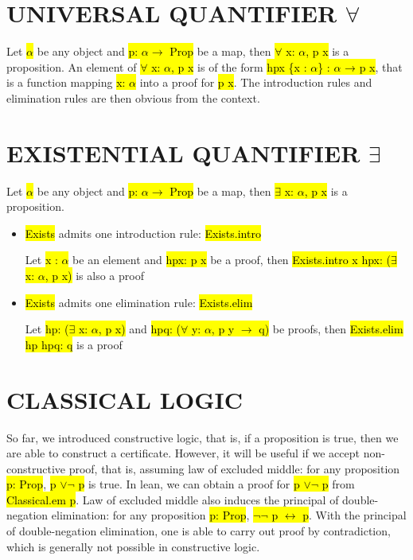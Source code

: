 \section{UNIVERSAL QUANTIFIER $\forall$}

Let \hl{$\alpha$} be any object and \hl{p: $\alpha \to$ Prop} be a map, then \hl{$\forall$ x: $\alpha$, p x} is a proposition. An element of \hl{$\forall$ x: $\alpha$, p x} is of the form \hl{hpx \{x : $\alpha$\} : $\alpha$ → p x}, that is a function mapping \hl{x: $\alpha$} into a proof for \hl{p x}. The introduction rules and elimination rules are then obvious from the context.

\section{EXISTENTIAL QUANTIFIER $\exists$}

Let \hl{$\alpha$} be any object and \hl{p: $\alpha \to$ Prop} be a map, then \hl{$\exists$ x: $\alpha$, p x} is a proposition.

\begin{itemize}
	\item \hl{Exists} admits one introduction rule: \hl{Exists.intro}
	
	Let \hl{x : $\alpha$} be an element and \hl{hpx: p x} be a proof, then \hl{Exists.intro x hpx: ($\exists$ x: $\alpha$, p x)} is also a proof
	
	\item \hl{Exists} admits one elimination rule: \hl{Exists.elim}
	
	Let \hl{hp: ($\exists$ x: $\alpha$, p x)} and \hl{hpq: ($\forall$ y: $\alpha$, p y $\to$ q)} be proofs, then \hl{Exists.elim hp hpq: q} is a proof 
\end{itemize}

\section{CLASSICAL LOGIC}

So far, we introduced constructive logic, that is, if a proposition is true, then we are able to construct a certificate. However, it will be useful if we accept non-constructive proof, that is, assuming law of excluded middle: for any proposition \hl{p: Prop}, \hl{p $\lor \lnot$ p} is true. In lean, we can obtain a proof for \hl{p $\lor \lnot$ p} from \hl{Classical.em p}. Law of excluded middle also induces the principal of double-negation elimination: for any proposition \hl{p: Prop}, \hl{$\lnot \lnot$ p $\leftrightarrow$ p}. With the principal of double-negation elimination, one is able to carry out proof by contradiction, which is generally not possible in constructive logic. 


